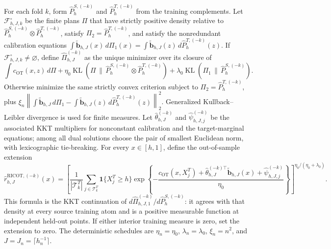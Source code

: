For each fold \(k\), form \(\widehat P^{S,(-k)}_h\) and \(\widehat P^{T,(-k)}_h\) from the training complements. Let \(\mathcal F^\circ_{h,J,k}\) be the finite plans \(\Pi\) that have strictly positive density relative to \(\widehat P^{S,(-k)}_h\otimes\widehat P^{T,(-k)}_h\), satisfy \(\Pi_2=\widehat P^{T,(-k)}_h\), and satisfy the nonredundant calibration equations \(\int\widetilde{\mathbf b}_{h,J}(x)\,d\Pi_1(x)=\int\widetilde{\mathbf b}_{h,J}(z)\,d\widehat P^{T,(-k)}_h(z)\). If \(\mathcal F^\circ_{h,J,k}\ne\varnothing\), define \(\widehat\Pi^{(-k)}_{h,J}\) as the unique minimizer over its closure of \[\int c_{\mathrm{OT}}(x,z)\,d\Pi+\eta_0\operatorname{KL}(\Pi\,\|\,\widehat P^{S,(-k)}_h\otimes\widehat P^{T,(-k)}_h)+\lambda_0\operatorname{KL}(\Pi_1\,\|\,\widehat P^{S,(-k)}_h).\] Otherwise minimize the same strictly convex criterion subject to \(\Pi_2=\widehat P^{T,(-k)}_h\), plus \(\xi_n\left\|\int\widetilde{\mathbf b}_{h,J}\,d\Pi_1-\int\widetilde{\mathbf b}_{h,J}(z)\,d\widehat P^{T,(-k)}_h(z)\right\|_2^2\). Generalized Kullback--Leibler divergence is used for finite measures. Let \(\widehat\theta^{(-k)}_{h,J}\) and \(\widehat\psi^{(-k)}_{h,J,j}\) be the associated KKT multipliers for nonconstant calibration and the target-marginal equations; among all dual solutions choose the pair of smallest Euclidean norm, with lexicographic tie-breaking. For every \(x\in[h,1]\), define the out-of-sample extension \[\widehat r^{\mathrm{RICOT},(-k)}_{h,J}(x)=\left[\frac1{|\mathcal T^T_k|}\sum_{j\in\mathcal T^T_k}\mathbf 1\{X_j^T\ge h\}\exp\left\{-\frac{c_{\mathrm{OT}}(x,X_j^T)+\widehat\theta_{h,J}^{(-k)\top}\widetilde{\mathbf b}_{h,J}(x)+\widehat\psi^{(-k)}_{h,J,j}}{\eta_0}\right\}\right]^{\eta_0/(\eta_0+\lambda_0)}.\] This formula is the KKT continuation of \(d\widehat\Pi^{(-k)}_{h,J,1}/d\widehat P^{S,(-k)}_h\): it agrees with that density at every source training atom and is a positive measurable function at independent held-out points. If either interior training measure is zero, set the extension to zero. The deterministic schedules are \(\eta_n=\eta_0\), \(\lambda_n=\lambda_0\), \(\xi_n=n^2\), and \(J=J_n=\lceil h_n^{-1}\rceil\).